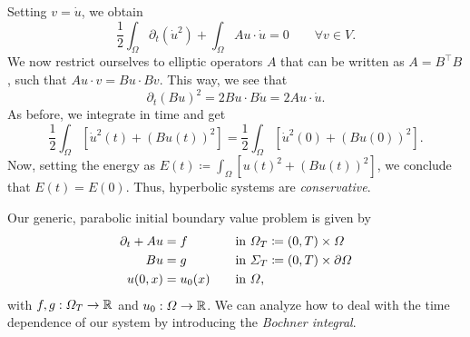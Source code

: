 \begin{enumerate}
\begin{equation}
    \end{equation}
    Setting $v=\dot{u}$, we obtain
    \begin{equation}
        \frac{1}{2}\int_\Omega \partial_t (\dot{u}^2) + \int_\Omega Au\cdot \dot{u} = 0 \qquad \forall v\in V.
    \end{equation}
    We now restrict ourselves to elliptic operators $A$ that can be written as $A=B^\top B$, such that $Au\cdot v = Bu\cdot Bv$. This way, we see that 
    \begin{equation}
        \partial_t (Bu)^2 = 2Bu \cdot B\dot{u} = 2Au\cdot \dot{u}.
    \end{equation}
    As before, we integrate in time and get 
    \begin{equation}
        \frac{1}{2} \int_\Omega \left[\dot{u}^2(t) + (Bu(t))^2\right] = \frac{1}{2} \int_\Omega \left[\dot{u}^2(0) + (Bu(0))^2\right].
    \end{equation}
    Now, setting the energy as $E(t)  \coloneqq  \int_\Omega \left[u(t)^2 + (Bu(t))^2\right]$, we conclude that $E(t) = E(0)$. Thus, hyperbolic systems are \emph{conservative}.
\end{enumerate}
Our generic, parabolic initial boundary value problem is given by
\begin{equation}\label{eq:parabolic-IBVP}
    \begin{aligned}
        \partial_t + Au &= f &&\quad \text{in }\Omega_T  \coloneqq  (0,T) \times \Omega\\
        \hfill Bu &= g &&\quad \text{in }\Sigma_T  \coloneqq  (0,T) \times \partial\Omega\\
        \hfill u(0,x)&= u_0(x) &&\quad \text{in }\Omega,
    \end{aligned}
\end{equation}
with $f,g:\Omega_T\to \mathbb{R}$ and $u_0:\Omega\to\mathbb{R}$. We can analyze how to deal with the time dependence of our system by introducing the \emph{Bochner integral}.

